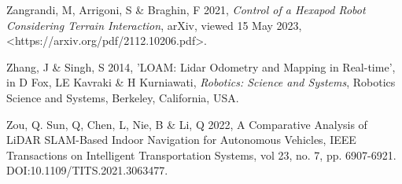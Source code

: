 Zangrandi, M, Arrigoni, S \& Braghin, F 2021, \textit{Control of a Hexapod Robot Considering Terrain Interaction}, arXiv, viewed 15 May 2023, \textless https://arxiv.org/pdf/2112.10206.pdf\textgreater.

Zhang, J \& Singh, S 2014, 'LOAM: Lidar Odometry and Mapping in Real-time', in D Fox, LE Kavraki \& H Kurniawati, \textit{Robotics: Science and Systems}, Robotics Science and Systems, Berkeley, California, USA.

Zou, Q. Sun, Q, Chen, L, Nie, B \& Li, Q 2022, A Comparative Analysis of LiDAR SLAM-Based
Indoor Navigation for Autonomous Vehicles, IEEE Transactions on Intelligent Transportation
Systems, vol 23, no. 7, pp. 6907-6921. DOI:10.1109/TITS.2021.3063477.